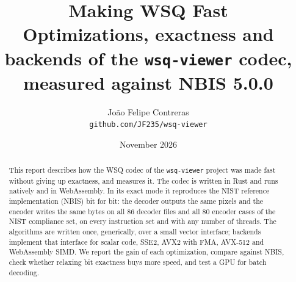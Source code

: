 \documentclass[11pt,a4paper]{article}
\title{Making WSQ Fast\\[0.4em]
  \large Optimizations, exactness and backends of the \texttt{wsq-viewer} codec,\\
  measured against NBIS 5.0.0}
\author{João Felipe Contreras\\\small\texttt{github.com/JF235/wsq-viewer}}
\date{November 2026}
\begin{document}
\maketitle

\begin{abstract}
\noindent
This report describes how the WSQ codec of the \texttt{wsq-viewer} project was made fast
without giving up exactness, and measures it. The codec is written in Rust and runs natively
and in WebAssembly. In its exact mode it reproduces the NIST reference implementation (NBIS)
bit for bit: the decoder outputs the same pixels and the encoder writes the same bytes on all
86 decoder files and all 80 encoder cases of the NIST compliance set, on every instruction set
and with any number of threads. The algorithms are written once, generically, over a small
vector interface; backends implement that interface for scalar code, SSE2, AVX2 with FMA,
AVX-512 and WebAssembly SIMD. We report the gain of each optimization, compare against NBIS,
check whether relaxing bit exactness buys more speed, and test a GPU for batch decoding.
\end{abstract}

\setcounter{tocdepth}{1}
\tableofcontents











\end{document}
